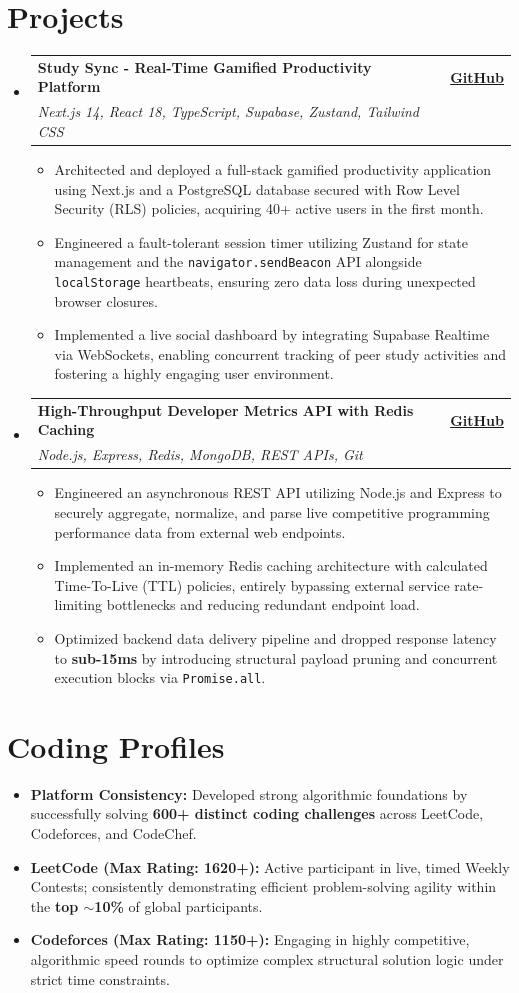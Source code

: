 \documentclass[letterpaper,11pt]{article}
\makeatletter
\newcommand{\resumeItem}[1]{
  \item\small{
    {#1 \vspace{-2pt}}
  }
}
\newcommand{\resumeProjectHeading}[3]{
  \vspace{-1pt}\item
    \begin{tabular*}{0.97\textwidth}[t]{l@{\extracolsep{\fill}}r}
      \textbf{#1} & #3 \\
      \textit{\small#2} & \\
    \end{tabular*}\vspace{-6pt}
}
\newcommand{\resumeSubHeadingListStart}{\begin{itemize}[leftmargin=0.15in, label={}]}
\newcommand{\resumeSubHeadingListEnd}{\end{itemize}}
\newcommand{\resumeItemListStart}{\begin{itemize}[itemsep=1pt, parseitemsep=1pt]}
\newcommand{\resumeItemListEnd}{\end{itemize}\vspace{-4pt}}
\makeatother
\begin{document}
\section*{Projects}
    \resumeSubHeadingListStart

      \resumeProjectHeading
          {Study Sync - Real-Time Gamified Productivity Platform}
          {Next.js 14, React 18, TypeScript, Supabase, Zustand, Tailwind CSS}
          {\href{https://github.com/dineshydk/study_sync}{\textbf{GitHub}}}
          \resumeItemListStart
            \resumeItem{Architected and deployed a full-stack gamified productivity application using Next.js and a PostgreSQL database secured with Row Level Security (RLS) policies, acquiring 40+ active users in the first month.}
            \resumeItem{Engineered a fault-tolerant session timer utilizing Zustand for state management and the \texttt{navigator.sendBeacon} API alongside \texttt{localStorage} heartbeats, ensuring zero data loss during unexpected browser closures.}
            \resumeItem{Implemented a live social dashboard by integrating Supabase Realtime via WebSockets, enabling concurrent tracking of peer study activities and fostering a highly engaging user environment.}
          \resumeItemListEnd
          
      \resumeProjectHeading
         {High-Throughput Developer Metrics API with Redis Caching}
          {Node.js, Express, Redis, MongoDB, REST APIs, Git}
          {\href{https://github.com/yourusername}{\textbf{GitHub}}}
          \resumeItemListStart
            \resumeItem{Engineered an asynchronous REST API utilizing Node.js and Express to securely aggregate, normalize, and parse live competitive programming performance data from external web endpoints.}
            \resumeItem{Implemented an in-memory Redis caching architecture with calculated Time-To-Live (TTL) policies, entirely bypassing external service rate-limiting bottlenecks and reducing redundant endpoint load.}
            \resumeItem{Optimized backend data delivery pipeline and dropped response latency to \textbf{sub-15ms} by introducing structural payload pruning and concurrent execution blocks via \texttt{Promise.all}.}
          \resumeItemListEnd

    \resumeSubHeadingListEnd


\section*{Coding Profiles}
  \resumeItemListStart
    \resumeItem{\textbf{Platform Consistency:} Developed strong algorithmic foundations by successfully solving \textbf{600+ distinct coding challenges} across LeetCode, Codeforces, and CodeChef.}
    \resumeItem{\textbf{LeetCode (Max Rating: 1620+):} Active participant in live, timed Weekly Contests; consistently demonstrating efficient problem-solving agility within the \textbf{top $\sim$10\%} of global participants.}
    \resumeItem{\textbf{Codeforces (Max Rating: 1150+):} Engaging in highly competitive, algorithmic speed rounds to optimize complex structural solution logic under strict time constraints.}
  \resumeItemListEnd
\end{document}
